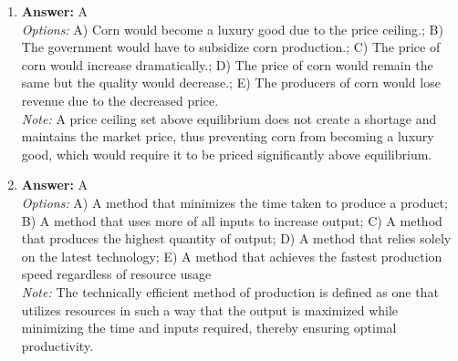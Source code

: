 \documentclass[12pt]{article}
\begin{document}
\begin{enumerate}[label=\arabic*.]
\item \textbf{Answer:} A
\\ \textit{Options:} A) Corn would become a luxury good due to the price ceiling.; B) The government would have to subsidize corn production.; C) The price of corn would increase dramatically.; D) The price of corn would remain the same but the quality would decrease.; E) The producers of corn would lose revenue due to the decreased price.
\\ \textit{Note:} A price ceiling set above equilibrium does not create a shortage and maintains the market price, thus preventing corn from becoming a luxury good, which would require it to be priced significantly above equilibrium.
\item \textbf{Answer:} A
\\ \textit{Options:} A) A method that minimizes the time taken to produce a product; B) A method that uses more of all inputs to increase output; C) A method that produces the highest quantity of output; D) A method that relies solely on the latest technology; E) A method that achieves the fastest production speed regardless of resource usage
\\ \textit{Note:} The technically efficient method of production is defined as one that utilizes resources in such a way that the output is maximized while minimizing the time and inputs required, thereby ensuring optimal productivity.
\end{enumerate}
\end{document}

